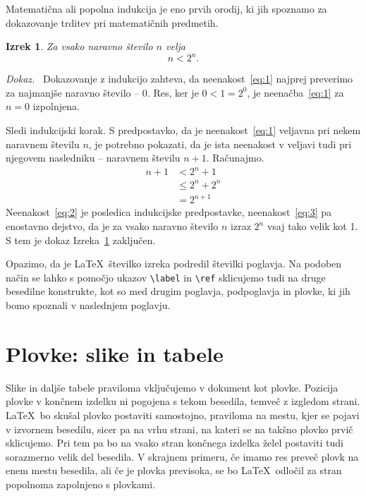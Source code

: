 \documentclass[a4paper,12pt,openright]{book}
\newtheorem{izrek}{Izrek}[chapter]
\newenvironment{dokaz}{\emph{Dokaz.}\ }{\hspace{\fill}{$\Box$}}
\begin{document}
    Matematična ali popolna indukcija je eno prvih orodij, ki jih spoznamo za dokazovanje trditev pri matematičnih predmetih.
    \begin{izrek}
        \label{iz:1}
        Za vsako naravno število $n$ velja
        \begin{equation}
            n < 2^n.
            \label{eq:1}
        \end{equation}
    \end{izrek}
    \begin{dokaz}
        Dokazovanje z indukcijo zahteva, da neenakost~\eqref{eq:1} najprej preverimo za najmanjše naravno število -- $0$.
        Res, ker je $0 < 1 = 2^0$, je neenačba~\eqref{eq:1} za $n=0$ izpolnjena.

        Sledi indukcijski korak. S predpostavko, da je neenakost~\eqref{eq:1} veljavna pri nekem naravnem številu $n$, je potrebno pokazati, da je ista neenakost v veljavi tudi pri njegovem nasledniku -- naravnem številu $n+1$.
        Računajmo.
        \begin{align}
            n+1 & < 2^n + 1       \label{eq:2}\\
            & \le 2^n + 2^n \label{eq:3}\\
            & = 2^{n+1}       \nonumber
        \end{align}
        Neenakost~\eqref{eq:2} je posledica indukcijske predpostavke, neenakost~\eqref{eq:3} pa enostavno dejstvo, da je za vsako naravno število $n$ izraz $2^n$ vsaj tako velik kot 1.
        S tem je dokaz Izreka~\ref{iz:1} zaključen.
    \end{dokaz}

    Opazimo, da je \LaTeX\ številko izreka podredil številki poglavja.
    Na podoben način se lahko s pomočjo ukazov \verb|\label| in \verb|\ref| sklicujemo tudi na druge besedilne konstrukte, kot so med drugim poglavja, podpoglavja in plovke, ki jih bomo spoznali v naslednjem poglavju.


    \chapter{Plovke: slike in tabele}
    \label{ch2}

    Slike in daljše tabele praviloma vključujemo v dokument kot plovke.
    Pozicija plovke v končnem izdelku ni pogojena s tekom besedila, temveč z izgledom strani.
    \LaTeX\ bo skušal plovko postaviti samostojno, praviloma na mestu, kjer se pojavi v izvornem besedilu, sicer pa na
    vrhu strani, na kateri se na takšno plovko prvič sklicujemo.
    Pri tem pa bo na vsako stran končnega izdelka želel postaviti tudi sorazmerno velik del besedila.
    V skrajnem primeru, če imamo res preveč plovk na enem mestu besedila, ali če je plovka previsoka, se bo \LaTeX\ odločil za stran popolnoma zapolnjeno s plovkami.
\end{document}
